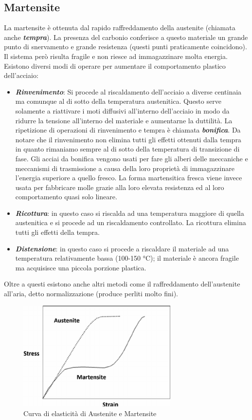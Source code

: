 \subsection{Martensite}

La martensite è ottenuta dal rapido raffreddamento della austenite (chiamata anche \textit{\textbf{tempra}}). La presenza del carbonio conferisce a questo materiale un grande punto di snervamento e grande resistenza (questi punti praticamente coincidono). Il sistema però risulta fragile e non riesce ad immagazzinare molta energia.
Esistono diversi modi di operare per aumentare il comportamento plastico dell'acciaio:
\begin{itemize}
    \item \textbf{\textit{Rinvenimento}}: Si procede al riscaldamento dell'acciaio a diverse centinaia ma comunque al di sotto della temperatura austenitica. Questo serve solamente a riattivare i moti diffusivi all'interno dell'acciaio in modo da ridurre la tensione all'interno del materiale e aumentarne la duttilità. La ripetizione di operazioni di rinvenimento e tempra è chiamata \textbf{\textit{bonifica}}.
    Da notare che il rinvenimento non elimina tutti gli effetti ottenuti dalla tempra in quanto rimaniamo sempre al di sotto della temperatura di transizione di fase. Gli acciai da bonifica vengono usati per fare gli alberi delle meccaniche e meccanismi di trasmissione a causa della loro proprietà di immagazzinare l'energia superiore a quello fresco. La forma martensitica fresca viene invece usata per fabbricare molle grazie alla loro elevata resistenza ed al loro comportamento quasi solo lineare.
    \item \textbf{\textit{Ricottura}}: in questo caso si riscalda ad una temperatura maggiore di quella austenitica e si procede ad un riscaldamento controllato. La ricottura elimina tutti gli effetti della tempra.
    \item \textbf{\textit{Distensione}}: in questo caso si procede a riscaldare il materiale ad una temperatura relativamente bassa (100-150 °C); il materiale è ancora fragile ma acquisisce una piccola porzione plastica.
\end{itemize}
Oltre a questi esistono anche altri metodi come il raffreddamento dell'austenite all'aria, detto normalizzazione (produce perliti molto fini).
\begin{figure}
    \centering
    \includegraphics[width=8cm]{acciaio e transizioni di fase/Austenite-Martensite.png}
    \caption{Curva di elasticità di Austenite e Martensite}
    \label{fig:enter-label}
\end{figure}

